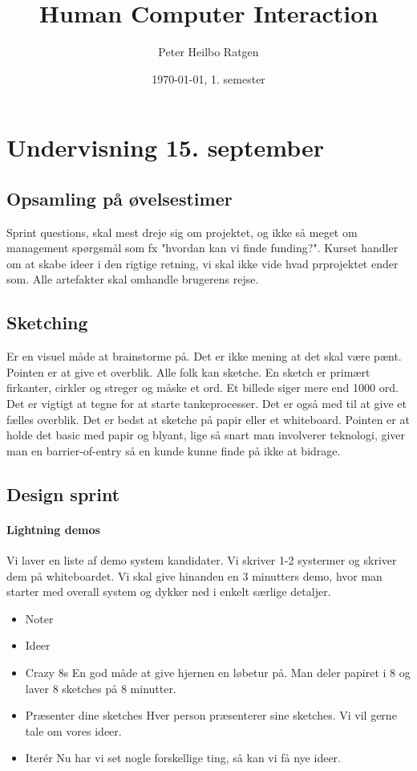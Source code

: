 \documentclass{article}
\title{Human Computer Interaction}
\author{Peter Heilbo Ratgen}
\date{\today, 1. semester}
\begin{document}
\maketitle

\section{Undervisning 15. september}
\subsection{Opsamling på øvelsestimer} 
Sprint questions, skal mest dreje sig om projektet, og ikke så meget om
management spørgsmål som fx "hvordan kan vi finde funding?".
Kurset handler om at skabe ideer i den rigtige retning, vi skal ikke vide hvad
prprojektet ender som. Alle artefakter skal omhandle brugerens rejse.

\subsection{Sketching}
Er en visuel måde at brainstorme på. Det er ikke mening at det skal være pænt.
Pointen er at give et overblik. Alle folk kan sketche. En sketch er primært
firkanter, cirkler og streger og måske et ord. Et billede siger mere end 1000
ord. 
Det er vigtigt at tegne for at starte tankeprocesser. Det er også med til at
give et fælles overblik. Det er bedst at sketche på papir eller et whiteboard.
Pointen er at holde det basic med papir og blyant, lige så snart man involverer
teknologi, giver man en barrier-of-entry så en kunde kunne finde på ikke at
bidrage.

\subsection{Design sprint}
\paragraph{Lightning demos} Vi laver en liste af demo system kandidater. Vi
skriver 1-2 systermer og skriver dem på whiteboardet. Vi skal give hinanden en 3
minutters demo, hvor man starter med overall system og dykker ned i enkelt
særlige detaljer.

\begin{itemize}
  \item Noter
  \item Ideer
  \item Crazy 8s
    \subitem En god måde at give hjernen en løbetur på. Man deler papiret i 8 og
    laver 8 sketches på 8 minutter.
  \item Præsenter dine sketches
    \subitem Hver person præsenterer sine sketches. Vi vil gerne tale om vores
    ideer.
  \item Iterér 
    \subitem Nu har vi set nogle forskellige ting, så kan vi få nye ideer.
\end{itemize}
\end{document}
